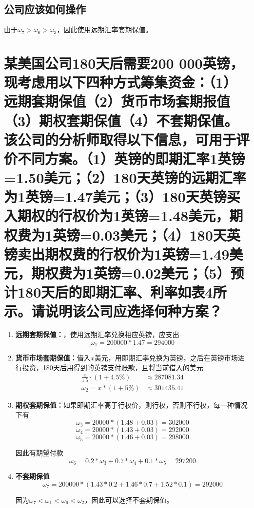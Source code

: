 \documentclass[UTF8]{ctexart}
\begin{document}
\subsection{公司应该如何操作}
由于$\omega_7 > \omega_6 > \omega_3$，因此使用远期汇率套期保值。

\section{某美国公司180天后需要200 000英镑，现考虑用以下四种方式筹集资金：（1）远期套期保值（2）货币市场套期报值（3）期权套期保值（4）不套期保值。该公司的分析师取得以下信息，可用于评价不同方案。（1）英镑的即期汇率1英镑=1.50美元；（2）180天英镑的远期汇率为1英镑=1.47美元；（3）180天英镑买入期权的行权价为1英镑=1.48美元，期权费为1英镑=0.03美元；（4）180天英镑卖出期权费的行权价为1英镑=1.49美元，期权费为1英镑=0.02美元；（5）预计180天后的即期汇率、利率如表4所示。请说明该公司应选择何种方案？}
\begin{enumerate}
    \item \textbf{远期套期保值：}，使用远期汇率兑换相应英镑，应支出
    \begin{equation*}
        \omega_1 = 200000 * 1.47 = 294000
    \end{equation*}
    \item \textbf{货币市场套期保值：}借入$x$美元，用即期汇率兑换为英镑，之后在英镑市场进行投资，180天后用得到的英镑支付账款，且将当前借入的美元
    \begin{align*}
        \frac{x}{1.5} \cdot (1+4.5\%) &\approx 287081.34\\
        \omega_2 = x*(1+5\%) &\approx 301435.41
    \end{align*}
    \item \textbf{期权套期保值：}如果即期汇率高于行权价，则行权，否则不行权，每一种情况下有
        \begin{equation*}
            \omega_3 = 20000 * (1.48+0.03) = 302000
        \end{equation*}
         \begin{equation*}
            \omega_4 = 20000 * (1.43+0.03) = 292000
        \end{equation*}
         \begin{equation*}
            \omega_5 = 20000 * (1.46+0.03) = 298000
        \end{equation*}
    \par 因此有期望付款\begin{equation*}
        \omega_6 = 0.2 * \omega_3 + 0.7 * \omega_4 + 0.1 * \omega_5 = 297200
    \end{equation*}
    \item \textbf{不套期保值}
        \begin{equation*}
            \omega_7 = 200000 * (1.43*0.2 + 1.46 * 0.7 +1.52*0.1) = 292000
        \end{equation*}
    
    \par 因为$\omega_7 < \omega_1 < \omega_6 < \omega_2$，因此可以选择不套期保值。    
\end{enumerate}
\end{document}
